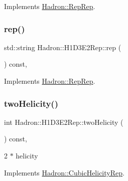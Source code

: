 Implements \mbox{\hyperlink{structHadron_1_1RepRep_ab3213025f6de249f7095892109575fde}{Hadron\+::\+Rep\+Rep}}.

\mbox{\label{structHadron_1_1H1D3E2Rep_ace031c7809b792a43f41c55b6b45c355}} 
\subsubsection{\texorpdfstring{rep()}{rep()}\hspace{0.1cm}{\footnotesize\ttfamily [5/5]}}
{\footnotesize\ttfamily std\+::string Hadron\+::\+H1\+D3\+E2\+Rep\+::rep (\begin{DoxyParamCaption}{ }\end{DoxyParamCaption}) const\hspace{0.3cm}{\ttfamily [inline]}, {\ttfamily [virtual]}}



Implements \mbox{\hyperlink{structHadron_1_1RepRep_ab3213025f6de249f7095892109575fde}{Hadron\+::\+Rep\+Rep}}.

\mbox{\label{structHadron_1_1H1D3E2Rep_abc2ae293f19603d5c8d08fc6f7fa7830}} 
\subsubsection{\texorpdfstring{twoHelicity()}{twoHelicity()}\hspace{0.1cm}{\footnotesize\ttfamily [1/3]}}
{\footnotesize\ttfamily int Hadron\+::\+H1\+D3\+E2\+Rep\+::two\+Helicity (\begin{DoxyParamCaption}{ }\end{DoxyParamCaption}) const\hspace{0.3cm}{\ttfamily [inline]}, {\ttfamily [virtual]}}

2 $\ast$ helicity 

Implements \mbox{\hyperlink{structHadron_1_1CubicHelicityRep_af507aa56fc2747eacc8cb6c96db31ecc}{Hadron\+::\+Cubic\+Helicity\+Rep}}.

\mbox{\label{structHadron_1_1H1D3E2Rep_abc2ae293f19603d5c8d08fc6f7fa7830}} 
